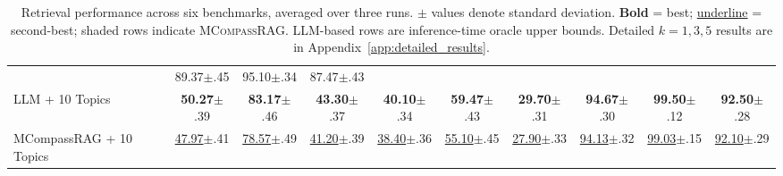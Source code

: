 \documentclass{llmxive}
\providecommand{\name}[1]{\textsc{MCompassRAG}\xspace}
\begin{document}
\begin{table}[h]
{\begin{tabular}{lccccccccc}
      & 89.37{\scriptsize$\pm$.45} & 95.10{\scriptsize$\pm$.34} & 87.47{\scriptsize$\pm$.43} \\
    LLM + 10 Topics
      & \textbf{50.27}{\scriptsize$\pm$.39} & \textbf{83.17}{\scriptsize$\pm$.46} & \textbf{43.30}{\scriptsize$\pm$.37}
      & \textbf{40.10}{\scriptsize$\pm$.34} & \textbf{59.47}{\scriptsize$\pm$.43} & \textbf{29.70}{\scriptsize$\pm$.31}
      & \textbf{94.67}{\scriptsize$\pm$.30} & \textbf{99.50}{\scriptsize$\pm$.12} & \textbf{92.50}{\scriptsize$\pm$.28} \\
    \hline
    \rowcolor{oursblue}
    MCompassRAG + 10 Topics
      & \underline{47.97}{\scriptsize$\pm$.41} & \underline{78.57}{\scriptsize$\pm$.49} & \underline{41.20}{\scriptsize$\pm$.39}
      & \underline{38.40}{\scriptsize$\pm$.36} & \underline{55.10}{\scriptsize$\pm$.45} & \underline{27.90}{\scriptsize$\pm$.33}
      & \underline{94.13}{\scriptsize$\pm$.32} & \underline{99.03}{\scriptsize$\pm$.15} & \underline{92.10}{\scriptsize$\pm$.29} \\
    \bottomrule
    \end{tabular}
    }%

    \caption{Retrieval performance across six benchmarks, averaged over three runs. $\pm$ values denote standard deviation. \textbf{Bold} = best; \underline{underline} = second-best; shaded rows indicate \name{}. LLM-based rows are inference-time oracle upper bounds. Detailed $k{=}1,3,5$ results are in Appendix~\ref{app:detailed_results}.}
    \label{tab:main_results}
    \vspace{-1em}
\end{table}
\end{document}
